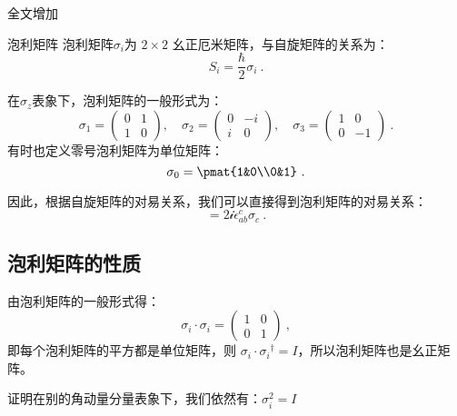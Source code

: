 
\begin{issues}
\issueDraft 全文增加\hat
\end{issues}


\begin{definition}{泡利矩阵}\label{def_pauliM_1}
泡利矩阵$\sigma_i$为 $2\times 2$ 幺正厄米矩阵，与自旋矩阵的关系为：
\begin{equation}
S_i=\frac{\hbar}{2}\sigma_i~.
\end{equation}
\end{definition}
在$\sigma_z$表象下，泡利矩阵的一般形式为：
\begin{equation}
\sigma_1 = \begin{pmatrix}
0 & 1\\
1 & 0
\end{pmatrix},\quad 
\sigma_2 = \begin{pmatrix}
0 & -i\\
i & 0
\end{pmatrix},\quad 
\sigma_3 = 
\begin{pmatrix}
1 & 0\\
0 & -1
\end{pmatrix}
~.
\end{equation}
有时也定义零号泡利矩阵为单位矩阵：
\begin{equation}
\sigma_0 = \pmat{1&0\\0&1}~.
\end{equation}

因此，根据自旋矩阵的对易关系，我们可以直接得到泡利矩阵的对易关系：
\begin{equation}
[\sigma_i,\sigma_j]=2\mathcal i\epsilon_{ab}^c\sigma_c~.
\end{equation}

\subsection{泡利矩阵的性质}
由泡利矩阵的一般形式得：
\begin{equation}
\sigma_i\cdot \sigma_i = \begin{pmatrix}1&0\\0&1\end{pmatrix}~,
\end{equation}
即每个泡利矩阵的平方都是单位矩阵，则 $\sigma_i \cdot  \sigma_i{}^\dagger = I$，所以泡利矩阵也是幺正矩阵。
\begin{exercise}{}
证明在别的角动量分量表象下，我们依然有：$\sigma_i^2=I$
\end{exercise}

